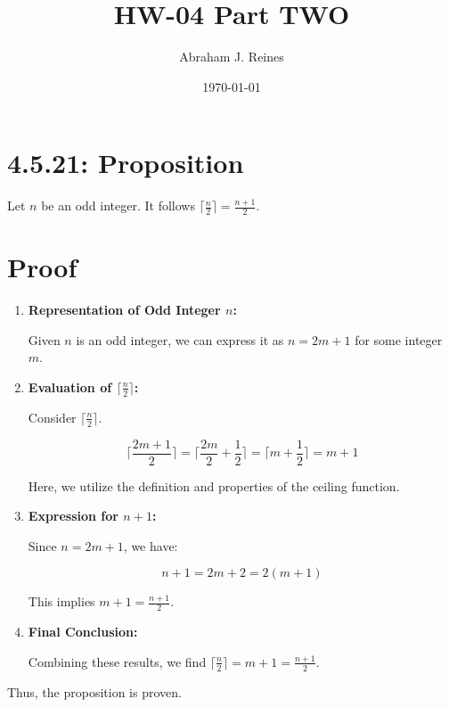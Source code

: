 \documentclass[12pt]{article}
\begin{document}
\doublespacing %

\title{HW-04 Part TWO}
\author{Abraham J. Reines}
\date{\today}
\maketitle

\section*{4.5.21: Proposition}

Let \( n \) be an odd integer. It follows \( \lceil \frac{n}{2} \rceil = \frac{n+1}{2} \).

\section*{Proof}

\begin{enumerate}

\item \textbf{Representation of Odd Integer \( n \):}

Given \( n \) is an odd integer, we can express it as \( n = 2m + 1 \) for some integer \( m \).

\item \textbf{Evaluation of \( \lceil \frac{n}{2} \rceil \):}

Consider \( \lceil \frac{n}{2} \rceil \).

\[
\lceil \frac{2m + 1}{2} \rceil
= \lceil \frac{2m}{2} + \frac{1}{2} \rceil
= \lceil m + \frac{1}{2} \rceil
= m + 1
\]

Here, we utilize the definition and properties of the ceiling function.

\item \textbf{Expression for \( n + 1 \):}

Since \( n = 2m + 1 \), we have:

\[
n + 1 = 2m + 2 = 2(m + 1)
\]

This implies \( m + 1 = \frac{n + 1}{2} \).

\item \textbf{Final Conclusion:}

Combining these results, we find \( \lceil \frac{n}{2} \rceil = m + 1 = \frac{n + 1}{2} \).

\end{enumerate}

Thus, the proposition is proven.
\end{document}

